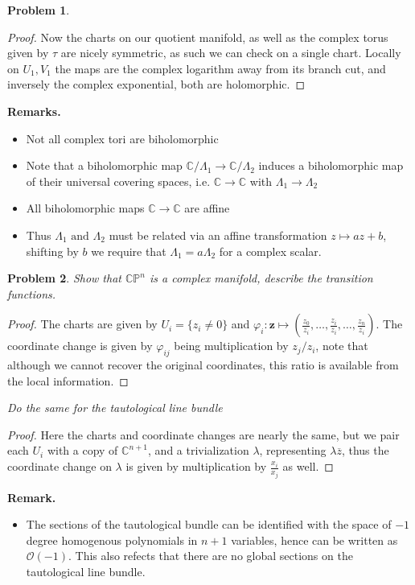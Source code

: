 \documentclass[11pt]{article}
\theoremstyle{definition}
\newtheorem{pb}{Problem}
\newcommand{\set}[1]{\{#1\}}
\newcommand{\tand}{\text{ and }}
\begin{document}
\begin{pb}
\begin{proof}
            Now the charts on our quotient manifold, as well as the complex torus given by \(\tau\) are nicely symmetric, as such we can check on a single chart. Locally on \(U_1, V_1\) the maps are the complex logarithm away from its branch cut, and inversely the complex exponential, both are holomorphic.
        \end{proof}
        
        \textbf{Remarks.}
        \begin{itemize}
            \item Not all complex tori are biholomorphic
            \item Note that a biholomorphic map \(\mathbb{C}/\Lambda_1 \to \mathbb{C}/\Lambda_2\) induces a biholomorphic map of their universal covering spaces, i.e. \(\mathbb{C} \to \mathbb{C}\) with \(\Lambda_1 \to \Lambda_2\)
            \item All biholomorphic maps \(\mathbb{C} \to \mathbb{C}\) are affine
            \item Thus \(\Lambda_1 \tand \Lambda_2\) must be related via an affine transformation \(z \mapsto az + b\), shifting by \(b\) we require that \(\Lambda_1 = a \Lambda_2\) for a complex scalar.
        \end{itemize}
        
    \end{pb}
    \begin{pb} \emph{Show that \(\mathbb{CP}^n\) is a complex manifold, describe the transition functions.}
        \begin{proof}
            The charts are given by \(U_i = \set{z_i \neq 0}\) and \(\varphi_i: \mathbf{z} \mapsto (\frac{z_0}{z_i},\hdots,\hat{\frac{z_i}{z_i}},\hdots,\frac{z_n}{z_i})\). The coordinate change is given by \(\varphi_{ij}\) being multiplication by \(z_j/z_i\), note that although we cannot recover the original coordinates, this ratio is available from the local information.
        \end{proof}
        \emph{Do the same for the tautological line bundle}
        \begin{proof}
            Here the charts and coordinate changes are nearly the same, but we pair each \(U_i\) with a copy of \(\mathbb{C}^{n+1}\), and a trivialization \(\lambda\), representing \(\lambda \overline{z}\), thus the coordinate change on \(\lambda\) is given by multiplication by \(\frac{x_i}{x_j}\) as well.
        \end{proof}

        \textbf{Remark.}
        \begin{itemize}
            \item The sections of the tautological bundle can be identified with the space of \(-1\) degree homogenous polynomials in \(n+1\) variables, hence can be written as \(\mathcal{O}(-1)\). This also refects that there are no global sections on the tautological line bundle.
        \end{itemize}
    \end{pb}
\end{document}

